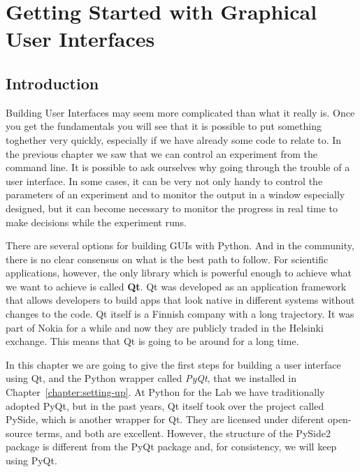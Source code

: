 \chapter{Getting Started with Graphical User Interfaces}\label{chapter:gui}


\section{Introduction}
Building User Interfaces may seem more complicated than what it really is. Once you get the fundamentals you will see that it is possible to put something toghether very quickly, especially if we have already some code to relate to. In the previous chapter we saw that we can control an experiment from the command line. It is possible to ask ourselves why going through the trouble of a user interface. In some cases, it can be very not only handy to control the parameters of an experiment and to monitor the output in a window especially designed, but it can become necessary to monitor the progress in real time to make decisions while the experiment runs.

There are several options for building GUIs with Python. And in the community, there is no clear consensus on what is the best path to follow. For scientific applications, however, the only library which is powerful enough to achieve what we want to achieve is called \textbf{Qt}. Qt was developed as an application framework that allows developers to build apps that look native in different systems without changes to the code. Qt itself is a Finnish company with a long trajectory. It was part of Nokia for a while and now they are publicly traded in the Helsinki exchange. This means that Qt is going to be around for a long time.

In this chapter we are going to give the first steps for building a user interface using Qt, and the Python wrapper called \emph{PyQt}, that we installed in Chapter~\ref{chapter:setting-up}. At Python for the Lab we have traditionally adopted PyQt, but in the past years, Qt itself took over the project called PySide, which is another wrapper for Qt. They are licensed under diferent open-source terms, and both are excellent. However, the structure of the PySide2 package is different from the PyQt package and, for consistency, we will keep using PyQt.



